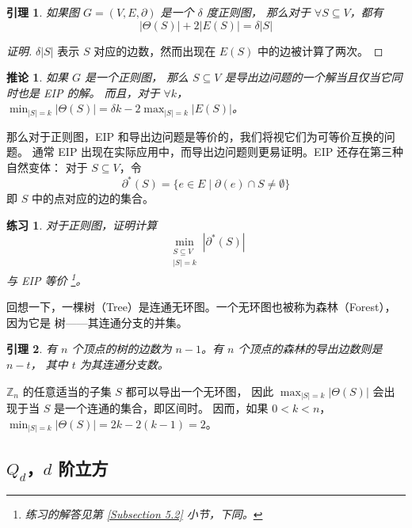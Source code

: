 \documentclass[12pt, a4paper]{article}
\newtheorem{lemma}{引理}
\newtheorem{corollary}{推论}
\newtheorem{exercise}{练习}
\begin{document}
\begin{lemma}
\label{Lemma 1}
如果图 $G = (V, E, \partial)$ 是一个 $\delta$ 度正则图，
那么对于 $\forall S \subseteq V$，都有
\begin{equation*}
|\Theta(S)| + 2 |E(S)| = \delta |S|
\end{equation*}
\end{lemma}

\begin{proof}[证明]
$\delta |S|$ 表示 $S$ 对应的边数，然而出现在 $E(S)$ 中的边被计算了两次。
\end{proof}

\begin{corollary}
\label{Corollary 1}
如果 $G$ 是一个正则图，
那么 $S \subseteq V$ 是导出边问题的一个解当且仅当它同时也是 EIP 的解。
而且，对于 $\forall k$，$\min_{|S| = k} |\Theta(S)| = \delta k − 2 \max_{|S| = k} |E(S)|$。
\end{corollary}

那么对于正则图，EIP 和导出边问题是等价的，我们将视它们为可等价互换的问题。
通常 EIP 出现在实际应用中，而导出边问题则更易证明。EIP 还存在第三种自然变体：
对于 $S \subseteq V$，令
\begin{equation*}
\partial^\ast(S) = \{e \in E \mid \partial(e) \cap S \neq \emptyset\}
\end{equation*}
即 $S$ 中的点对应的边的集合。

\begin{exercise}
\label{Exercise 1}
对于正则图，证明计算
\begin{equation*}
\min_{\substack{
	S \subseteq V \\
	|S| = k
}}|\partial^\ast(S)|
\end{equation*}
与 EIP 等价 \footnote{练习的解答见第 \ref{Subsection 5.2} 小节，下同。}。
\end{exercise}

回想一下，一棵树（Tree）是连通无环图。一个无环图也被称为森林（Forest），因为它是
树——其连通分支的并集。

\begin{lemma}
\label{Lemma 2}
有 $n$ 个顶点的树的边数为 $n − 1$。有 $n$ 个顶点的森林的导出边数则是 $n - t$，
其中 $t$ 为其连通分支数。
\end{lemma}

$\mathbb{Z}_n$ 的任意适当的子集 $S$ 都可以导出一个无环图，
因此 $\max_{|S| = k} |\Theta(S)|$ 会出现于当 $S$ 是一个连通的集合，即区间时。
因而，如果 $0 < k < n$，$\min_{|S| = k} |\Theta(S)| = 2 k − 2 (k − 1) = 2$。

\subsection{$Q_d$，$d$ 阶立方}
\label{Subsection 2.3}
\end{document}
